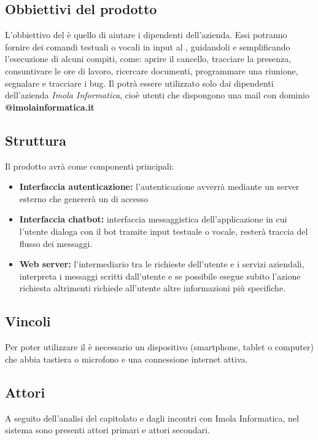 \subsection{Obbiettivi del prodotto}
L'obbiettivo del  è quello di aiutare i dipendenti dell'azienda. Essi potranno fornire dei comandi testuali o vocali in input al  , guidandoli e semplificando l'esecuzione di alcuni compiti, come: aprire il cancello, tracciare la presenza, 
consuntivare le ore di lavoro, ricercare documenti, programmare una riunione, segnalare e 
tracciare i bug. \newline
Il  potrà essere utilizzato solo dai dipendenti dell'azienda \textit{Imola Informatica}, cioè utenti che dispongono una
mail con dominio \textbf{@imolainformatica.it}

\subsection{Struttura}
Il prodotto avrà come componenti principali:
\begin{itemize}
    \item \textbf{Interfaccia autenticazione:} l'autenticazione avverrà mediante un server esterno che 
                genererà un  di accesso
    \item \textbf{Interfaccia chatbot:} interfaccia messaggistica dell'applicazione in cui l'utente dialoga 
                con il bot tramite input testuale o vocale, resterà traccia del flusso dei messaggi.
    \item \textbf{Web server:} l'intermediario tra le richieste dell'utente e i servizi aziendali, interpreta 
                i messaggi scritti dall'utente e se possibile esegue subito l'azione richiesta altrimenti 
                richiede all'utente altre informazioni più specifiche.
\end{itemize}

\subsection{Vincoli}
Per poter utilizzare il  è necessario un dispositivo (smartphone, tablet o computer) che 
abbia tastiera o microfono e una connessione internet attiva.

\subsection{Attori}
A seguito dell'analisi del capitolato e dagli incontri con Imola Informatica, nel sistema sono presenti attori primari e attori secondari.
